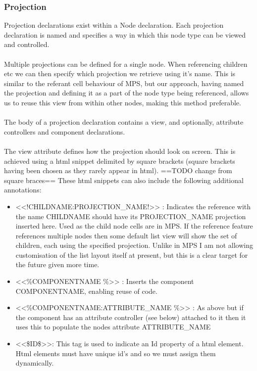 \documentclass{article}
\begin{document}
\subsubsection{Projection}
Projection declarations exist within a Node declaration. Each projection declaration is named and specifies a way in which this node type can be viewed and controlled.
\\
\\
Multiple projections can be defined for a single node. When referencing children etc we can then specify which projection we retrieve using it's name. This is similar to the referant cell behaviour of MPS, but our approach, having named the projection and defining it as a part of the node type being referenced, allows us to reuse this view from within other nodes, making this method preferable.
\\
\\
The body of a projection declaration contains a view, and optionally, attribute controllers and component declarations.
\\
\\
The view attribute defines how the projection should look on screen. This is achieved using a html snippet delimited by square brackets (square brackets having been chosen as they rarely appear in html). 
==TODO change from square braces== These html snippets can also include the following additional annotations:
\begin{itemize}
\item <<!CHILDNAME:PROJECTION\_NAME!>> : Indicates the reference with the name CHILDNAME should have its PROJECTION\_NAME projection inserted here. Used as the child node cells are in MPS. If the reference feature references multiple nodes then some default list view will show the set of children, each using the specified projection. Unlike in MPS I am not allowing customisation of the list layout itself at present, but this is a clear target for the future given more time.
\item <<\%COMPONENTNAME \%>> : Inserts the component COMPONENTNAME, enabling reuse of code.
\item <<\%COMPONENTNAME:ATTRIBUTE\_NAME \%>> : As above but if the component has an attribute controller (see below) attached to it then it uses this to populate the nodes attribute ATTRIBUTE\_NAME
\item <<\$ID\$>>: This tag is used to indicate an Id property of a html element. Html elements must have unique id's and so we must assign them dynamically.
\end{itemize}
\end{document}
